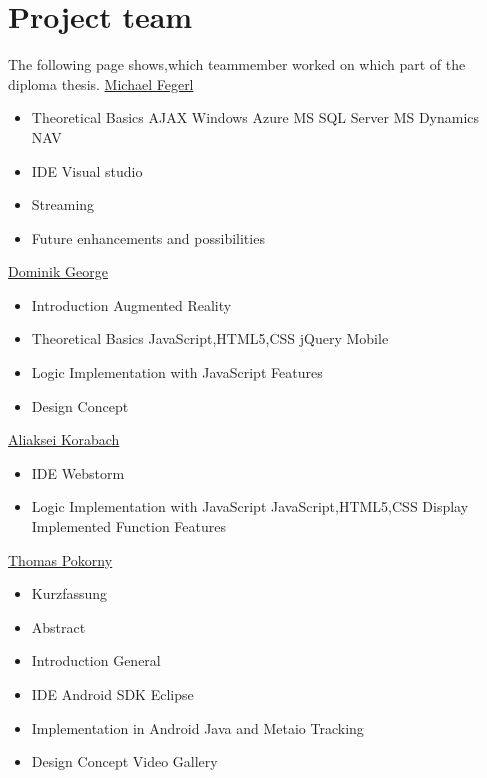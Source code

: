 

\chapter*{Project team}

 The following page shows,which teammember worked on which part of the \\diploma
 thesis.
\newline
\newline
 	\uline{Michael Fegerl}
	\begin{itemize}
	\item Theoretical Basics
	\subitem AJAX
	\subitem Windows Azure
	\subitem MS SQL Server
	\subitem MS Dynamics NAV
	\item IDE
	\subitem Visual studio
	\item Streaming
	\item Future enhancements and possibilities
	\end{itemize}
	
	 	\uline{Dominik George}
		\begin{itemize}
		\item Introduction
		\subitem Augmented Reality
		\item Theoretical Basics
		\subitem JavaScript,HTML5,CSS
		\subitem jQuery Mobile
		\item Logic Implementation with JavaScript
		\subitem Features
		\item Design Concept
		\end{itemize}
		
			\uline{Aliaksei Korabach}
				\begin{itemize}
				\item IDE
				\subitem Webstorm
				\item Logic Implementation with JavaScript
				\subitem JavaScript,HTML5,CSS
				\subitem Display
				\subitem Implemented Function
				\subitem Features
			

				\end{itemize}
				
			\uline{Thomas Pokorny}
					\begin{itemize}
					\item Kurzfassung
					\item Abstract
					\item Introduction
				    \subitem General
				    \item IDE
				    \subitem Android SDK Eclipse
				    \item Implementation in Android Java and Metaio Tracking 
				    \item Design Concept
				    \subitem Video Gallery
				
				
					\end{itemize}